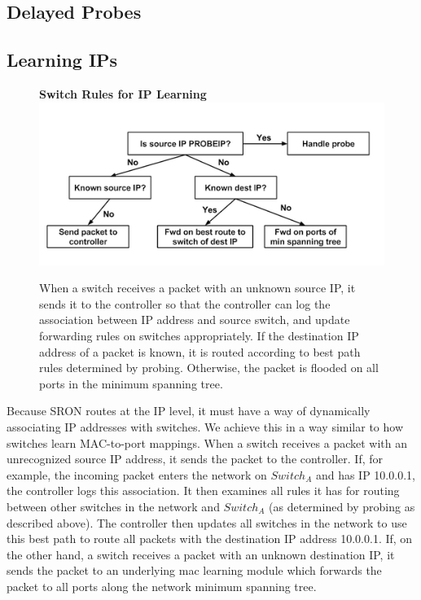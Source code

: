 \documentclass[pageno]{jpaper}
\begin{document}
\subsection{Delayed Probes}


\subsection{Learning IPs}
\begin{figure}[ht]
\centering
\textbf{Switch Rules for IP Learning}
\includegraphics[scale=0.7]{IPLearner.png}
\caption{When a switch receives a packet with an unknown source IP, it sends it to the controller so that the controller can log the association between IP address and source switch, and update forwarding rules on switches appropriately.  If the destination IP address of a packet is known, it is routed according to best path rules determined by probing.  Otherwise, the packet is flooded on all ports in the minimum spanning tree.}
\end{figure}

Because SRON routes at the IP level, it must have a way of dynamically associating IP addresses with switches.  We achieve this in a way similar to how switches learn MAC-to-port mappings.  When a switch receives a packet with an unrecognized source IP address, it sends the packet to the controller.  If, for example, the incoming packet enters the network on $Switch_A$ and has IP 10.0.0.1, the controller logs this association.  It then examines all rules it has for routing between other switches in the network and $Switch_A$ (as determined by probing as described above).  The controller then updates all switches in the network to use this best path to route all packets with the destination IP address 10.0.0.1.  If, on the other hand, a switch receives a packet with an unknown destination IP, it sends the packet to an underlying mac learning module which forwards the packet to all ports along the network minimum spanning tree.  
\end{document}

